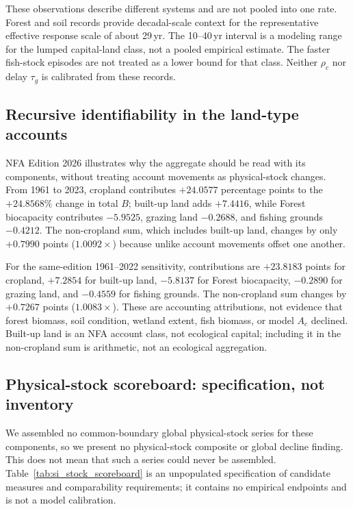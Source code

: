 \documentclass[11pt,a4paper]{article}
\begin{document}
These observations describe different systems and are not pooled into one rate. Forest and soil records provide decadal-scale context for the representative effective response scale of about 29\,yr. The 10--40\,yr interval is a modeling range for the lumped capital-land class, not a pooled empirical estimate. The faster fish-stock episodes are not treated as a lower bound for that class. Neither $\rho_c$ nor delay $\tau_g$ is calibrated from these records.

\subsection{Recursive identifiability in the land-type accounts}\label{si:recursive}

NFA Edition 2026 illustrates why the aggregate should be read with its components, without treating account movements as physical-stock changes. From 1961 to 2023, cropland contributes $+24.0577$ percentage points to the $+24.8568\%$ change in total $B$; built-up land adds $+7.4416$, while Forest biocapacity contributes $-5.9525$, grazing land $-0.2688$, and fishing grounds $-0.4212$. The non-cropland sum, which includes built-up land, changes by only $+0.7990$ points ($1.0092\times$) because unlike account movements offset one another.

For the same-edition 1961--2022 sensitivity, contributions are $+23.8183$ points for cropland, $+7.2854$ for built-up land, $-5.8137$ for Forest biocapacity, $-0.2890$ for grazing land, and $-0.4559$ for fishing grounds. The non-cropland sum changes by $+0.7267$ points ($1.0083\times$). These are accounting attributions, not evidence that forest biomass, soil condition, wetland extent, fish biomass, or model $A_c$ declined. Built-up land is an NFA account class, not ecological capital; including it in the non-cropland sum is arithmetic, not an ecological aggregation.

\subsection{Physical-stock scoreboard: specification, not inventory}\label{si:stocks}

We assembled no common-boundary global physical-stock series for these components, so we present no physical-stock composite or global decline finding. This does not mean that such a series could never be assembled. Table~\ref{tab:si_stock_scoreboard} is an unpopulated specification of candidate measures and comparability requirements; it contains no empirical endpoints and is not a model calibration.
\end{document}
